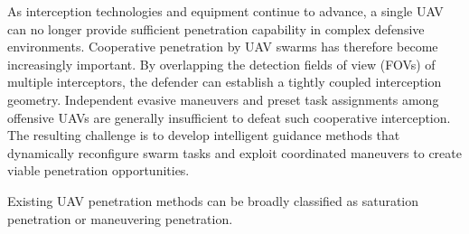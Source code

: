\documentclass{cja}
\begin{document}
As interception technologies and equipment continue to advance, a single UAV can no longer provide sufficient penetration capability in complex defensive environments. Cooperative penetration by UAV swarms has therefore become increasingly important.
By overlapping the detection fields of view (FOVs) of multiple interceptors, the defender can establish a tightly coupled interception geometry. 
Independent evasive maneuvers and preset task assignments among offensive UAVs are generally insufficient to defeat such cooperative interception.
The resulting challenge is to develop intelligent guidance methods that dynamically reconfigure swarm tasks and exploit coordinated maneuvers to create viable penetration opportunities.


Existing UAV penetration methods can be broadly classified as saturation penetration or maneuvering penetration.
\end{document}
